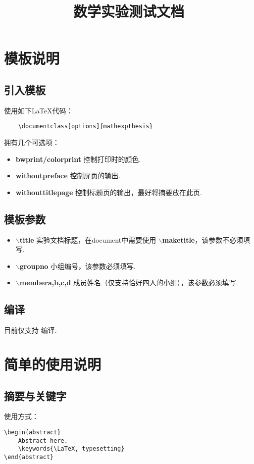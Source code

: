 \documentclass[bwprint, withouttitlepage]{mathexpthesis}
\title{数学实验测试文档}
\begin{document}
\maketitle
\tableofcontents
\section{模板说明}
\subsection{引入模板}
使用如下\LaTeX 代码：
\begin{verbatim}
    \documentclass[options]{mathexpthesis}
\end{verbatim}

拥有几个可选项：
\begin{itemize}[itemindent=2em]
    \item \textbf{bwprint/colorprint} 控制打印时的颜色.
    \item \textbf{withoutpreface} 控制扉页的输出.
    \item \textbf{withouttitlepage} 控制标题页的输出，最好将摘要放在此页.
\end{itemize}

\subsection{模板参数}
\begin{itemize}[itemindent=2em]
    \item \textbf{$\backslash$title} 实验文档标题，在document中需要使用 \textbf{$\backslash$maketitle}，该参数不必须填写.
    \item \textbf{$\backslash$groupno} 小组编号，该参数必须填写.
    \item \textbf{$\backslash$membera,b,c,d} 成员姓名（仅支持恰好四人的小组），该参数必须填写.
\end{itemize}

\subsection{编译}
目前仅支持 编译.

\section{简单的使用说明}
\subsection{摘要与关键字}
使用方式：
\begin{verbatim}
\begin{abstract}
    Abstract here.
    \keywords{\LaTeX, typesetting}
\end{abstract}
\end{verbatim}
\end{document}

